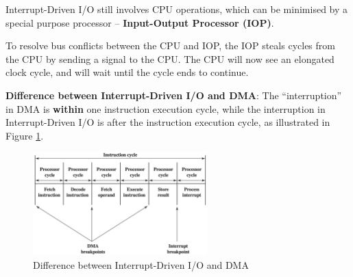 Interrupt-Driven I/O still involves CPU operations, which can be minimised by a special
purpose processor -- \textbf{Input-Output Processor (IOP)}.

To resolve bus conflicts between the CPU and IOP, the IOP steals cycles from the CPU by
sending a signal to the CPU. The CPU will now see an elongated clock cycle, and will wait
until the cycle ends to continue.

\textbf{Difference between Interrupt-Driven I/O and DMA}: The ``interruption'' in DMA is
\textbf{within} one instruction execution cycle, while the interruption in Interrupt-Driven
I/O is after the instruction execution cycle, as illustrated in Figure
\ref{fig:interrupt-driven-io-vs-dma}.

\begin{figure}[H]
    \centering
    \includegraphics[width=0.6\textwidth]{chaps/input-output/interrupt-driven-io-vs-dma.png}
    \caption{Difference between Interrupt-Driven I/O and DMA}
    \label{fig:interrupt-driven-io-vs-dma}
\end{figure}